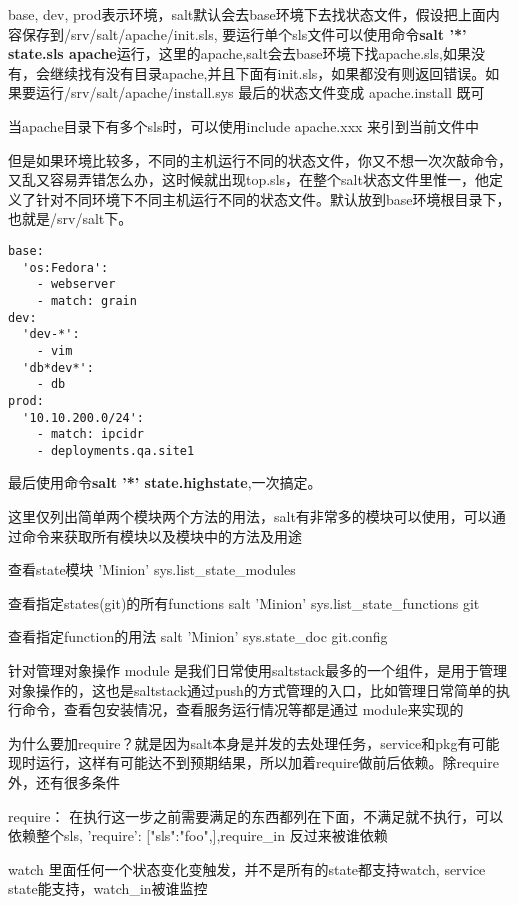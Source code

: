 base, dev, prod表示环境，salt默认会去base环境下去找状态文件，假设把上面内容保存到/srv/salt/apache/init.sls, 要运行单个sls文件可以使用命令\textbf{salt '*' state.sls apache}运行，这里的apache,salt会去base环境下找apache.sls,如果没有，会继续找有没有目录apache,并且下面有init.sls，如果都没有则返回错误。如果要运行/srv/salt/apache/install.sys 最后的状态文件变成  apache.install 既可



当apache目录下有多个sls时，可以使用include apache.xxx 来引到当前文件中

但是如果环境比较多，不同的主机运行不同的状态文件，你又不想一次次敲命令，又乱又容易弄错怎么办，这时候就出现top.sls，在整个salt状态文件里惟一，他定义了针对不同环境下不同主机运行不同的状态文件。默认放到base环境根目录下，也就是/srv/salt下。
\begin{lstlisting}
base:
  'os:Fedora':
    - webserver
    - match: grain
dev:
  'dev-*':
    - vim
  'db*dev*':
    - db
prod:
  '10.10.200.0/24':
    - match: ipcidr
    - deployments.qa.site1
\end{lstlisting}

最后使用命令\textbf{salt '*' state.highstate},一次搞定。

这里仅列出简单两个模块两个方法的用法，salt有非常多的模块可以使用，可以通过命令来获取所有模块以及模块中的方法及用途

\begin{description}
\item{查看state模块} 'Minion' sys.list_state_modules
\item{查看指定states(git)的所有functions} salt 'Minion' sys.list_state_functions git 
\item{查看指定function的用法} salt 'Minion' sys.state_doc git.config
\end{description}



针对管理对象操作
module 是我们日常使用saltstack最多的一个组件，是用于管理对象操作的，这也是saltstack通过push的方式管理的入口，比如管理日常简单的执行命令，查看包安装情况，查看服务运行情况等都是通过 module来实现的 


为什么要加require？就是因为salt本身是并发的去处理任务，service和pkg有可能现时运行，这样有可能达不到预期结果，所以加着require做前后依赖。除require外，还有很多条件

require： 在执行这一步之前需要满足的东西都列在下面，不满足就不执行，可以依赖整个sls, {'require': [{"sls":"foo"},]},require_in 反过来被谁依赖

watch 里面任何一个状态变化变触发，并不是所有的state都支持watch, service state能支持，watch_in被谁监控


